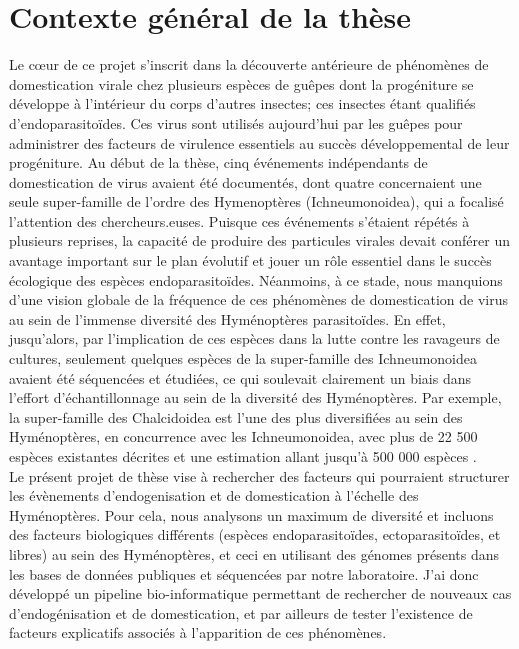 \thispagestyle{empty}
\chapter{Contexte général de la thèse}
{\hypersetup{linkcolor=GREYDARK}\minitoc}
\label{chap:intro-Context}
\newpage

Le cœur de ce projet s'inscrit dans la découverte antérieure de phénomènes de domestication virale chez plusieurs espèces de guêpes dont la progéniture se développe à l'intérieur du corps d'autres insectes; ces insectes étant qualifiés d'endoparasitoïdes. Ces virus sont utilisés aujourd’hui par les guêpes pour administrer des facteurs de virulence essentiels au succès développemental de leur progéniture. Au début de la thèse, cinq événements indépendants de domestication de virus avaient été documentés, dont quatre concernaient une seule super-famille de l’ordre des Hymenoptères (Ichneumonoidea), qui a focalisé l’attention des chercheurs.euses. Puisque ces événements s'étaient répétés à plusieurs reprises, la capacité de produire des particules virales devait conférer un avantage important sur le plan évolutif et jouer un rôle essentiel dans le succès écologique des espèces endoparasitoïdes. Néanmoins, à ce stade, nous manquions d’une vision globale de la fréquence de ces phénomènes de domestication de virus au sein de l’immense diversité des Hyménoptères parasitoïdes. En effet, jusqu'alors, par l'implication de ces espèces dans la lutte contre les ravageurs de cultures, seulement quelques espèces de la super-famille des Ichneumonoidea avaient été séquencées et étudiées, ce qui soulevait clairement un biais dans l'effort d'échantillonnage au sein de la diversité des Hyménoptères. Par exemple, la super-famille des Chalcidoidea est l'une des plus diversifiées au sein des Hyménoptères, en concurrence avec les Ichneumonoidea, avec plus de 22 500 espèces existantes décrites et une estimation allant jusqu'à 500 000 espèces \citep{heraty_phylogenetic_2013}. \\

Le présent projet de thèse vise à rechercher des facteurs qui pourraient structurer les évènements d'endogenisation et de domestication à l'échelle des Hyménoptères. Pour cela, nous analysons un maximum de diversité et incluons des facteurs biologiques différents (espèces endoparasitoïdes, ectoparasitoïdes, et libres) au sein des Hyménoptères, et ceci en utilisant des génomes présents dans les bases de données publiques et séquencées par notre laboratoire.  J'ai  donc développé un pipeline bio-informatique permettant de rechercher de nouveaux cas d'endogénisation et de domestication, et par ailleurs de tester l'existence de facteurs explicatifs  associés à l'apparition de ces phénomènes.\\


